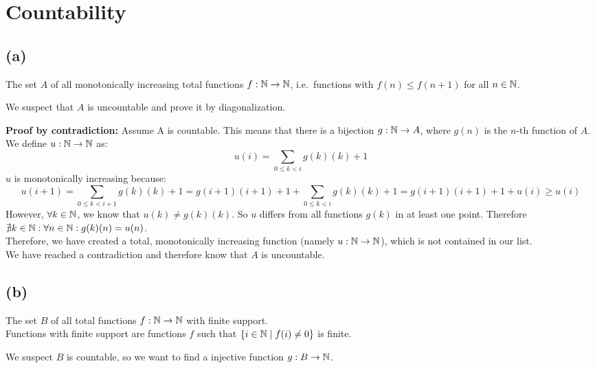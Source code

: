 

\setcounter{section}{3}


\section{Countability}

\subsection{(a)}
The set $A$ of all monotonically increasing total functions $f:\mathbb{N} \rightarrow \mathbb{N}$, i.e.\ functions with $f(n) \leq f(n+1)$ for all $n\in \mathbb{N}$.

We suspect that $A$ is uncountable and prove it by diagonalization.

\textbf{Proof by contradiction:} Assume A is countable. This means that there is a bijection $g:\mathbb{N} \rightarrow A$, where $g(n)$ is the $n$-th function of $A$.\\
We define $u:\mathbb{N}\rightarrow\mathbb{N}$ as:
$$u(i) = \sum_{0\leq k < i}g(k)(k) + 1$$
$u$ is monotonically increasing because:
$$u(i+1) = \sum_{0\leq k < i+1}g(k)(k) +1 = g(i+1)(i+1)+1 + \sum_{0\leq k < i}g(k)(k)+1 = g(i+1)(i+1)+1 + u(i) \geq u(i)$$
However, $\forall k \in \mathbb{N}$, we know that $u(k) \neq g(k)(k)$. So $u$ differs from all functions $g(k)$ in at least one point. Therefore $\nexists k\in \mathbb{N}: \forall n \in \mathbb{N}: g(k)(n) = u(n)$.\\
Therefore, we have created a total, monotonically increasing function (namely $u:\mathbb{N} \rightarrow \mathbb{N}$), which is not contained in our list.\\
We have reached a contradiction and therefore know that $A$ is uncountable.


\subsection{(b)}
The set $B$ of all total functions $f:\mathbb{N} \rightarrow \mathbb{N}$ with finite support.\\
Functions with finite support are functions $f$ such that $\left\{ i \in \mathbb{N} \mid f(i) \neq 0 \right\}$ is finite.

We suspect $B$ is countable, so we want to find a injective function $g:B\rightarrow\mathbb{N}$.

